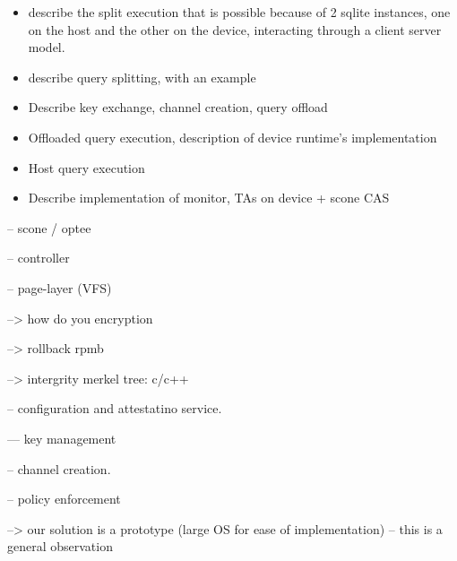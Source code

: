 


\begin{itemize}
    \item describe the split execution that is possible because of 2 sqlite instances, one on the host and the other on the device, interacting through a client server model.
    \item describe query splitting, with an example
    \item Describe key exchange, channel creation, query offload
    \item Offloaded query execution, description of device runtime's implementation
    \item Host query execution
    \item Describe implementation of monitor, TAs on device + scone CAS
\end{itemize}
\fi


-- scone / optee

-- controller



-- page-layer (VFS)

--> how do you encryption

--> rollback rpmb

--> intergrity merkel tree: c/c++



-- configuration and attestatino service.



--- key management


-- channel creation.

-- policy enforcement



--> our solution is a prototype (large OS for ease of implementation) -- this is a general observation

